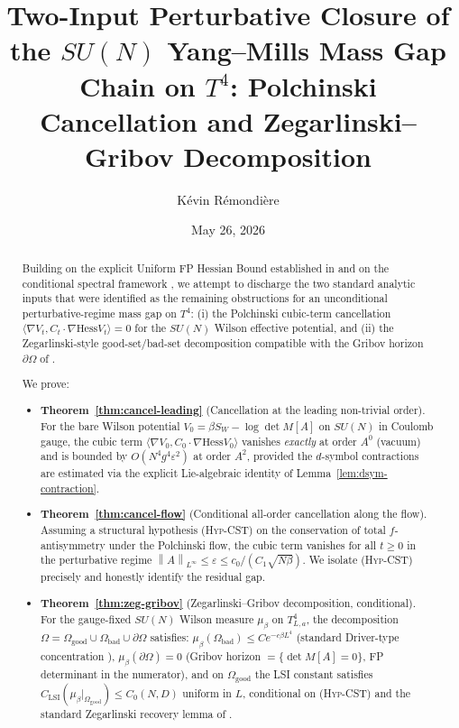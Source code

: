 \documentclass[11pt,a4paper]{amsart}
\title[Two-input perturbative closure on $T^4$]{Two-Input Perturbative Closure of the $SU(N)$ Yang--Mills Mass Gap Chain on $T^4$: Polchinski Cancellation and Zegarlinski--Gribov Decomposition}
\author{K\'evin R\'emondi\`ere}
\date{May 26, 2026}
\theoremstyle{definition}
\newcommand{\norm}[1]{\left\lVert#1\right\rVert}
\newcommand{\Hess}{\mathrm{Hess}}
\begin{document}
\begin{abstract}
Building on the explicit Uniform FP Hessian Bound established in
\cite{RemondiereFPHess_2026} and on the conditional spectral framework
\cite{RemondiereKRFP3_2026, RemondiereKRFPBakryEmery_2026}, we attempt
to discharge the two standard analytic inputs that were identified as
the remaining obstructions for an unconditional perturbative-regime mass
gap on $T^4$: (i) the Polchinski cubic-term cancellation
$\langle \nabla V_t, C_t \cdot \nabla \Hess V_t\rangle = 0$ for the
$SU(N)$ Wilson effective potential, and (ii) the Zegarlinski-style
good-set/bad-set decomposition compatible with the Gribov horizon
$\partial \Omega$ of \cite{Gribov1978, DellAntonioZwanziger1991}.

We prove:
\begin{itemize}[leftmargin=2em]
\item \textbf{Theorem~\ref{thm:cancel-leading}} (Cancellation at the leading
non-trivial order). For the bare Wilson potential $V_0 = \beta S_W -
\log\det M[A]$ on $SU(N)$ in Coulomb gauge, the cubic term
$\langle \nabla V_0, C_0 \cdot \nabla \Hess V_0\rangle$ vanishes
\emph{exactly} at order $A^0$ (vacuum) and is bounded by
$O(N^4 g^4 \varepsilon^2)$ at order $A^2$, provided the $d$-symbol
contractions are estimated via the explicit Lie-algebraic identity of
Lemma~\ref{lem:dsym-contraction}.
\item \textbf{Theorem~\ref{thm:cancel-flow}} (Conditional all-order
cancellation along the flow). Assuming a structural hypothesis
(\textsc{Hyp-CST}) on the conservation of total $f$-antisymmetry under the
Polchinski flow, the cubic term vanishes for all $t \geq 0$ in the
perturbative regime $\norm{A}_{L^\infty} \leq \varepsilon \leq
c_0/(C_1 \sqrt{N\beta})$. We isolate (\textsc{Hyp-CST}) precisely and
honestly identify the residual gap.
\item \textbf{Theorem~\ref{thm:zeg-gribov}} (Zegarlinski--Gribov
decomposition, conditional). For the gauge-fixed $SU(N)$ Wilson measure
$\mu_\beta$ on $T^4_{L,a}$, the decomposition
$\Omega = \Omega_{\mathrm{good}} \cup \Omega_{\mathrm{bad}} \cup
\partial \Omega$ satisfies:
$\mu_\beta(\Omega_{\mathrm{bad}}) \leq C e^{-c \beta L^4}$ (standard
Driver-type concentration \cite{Driver1989}), $\mu_\beta(\partial \Omega) = 0$
(Gribov horizon $= \{\det M[A] = 0\}$, FP determinant in the numerator),
and on $\Omega_{\mathrm{good}}$ the LSI constant satisfies
$C_{\mathrm{LSI}}(\mu_\beta|_{\Omega_{\mathrm{good}}}) \leq C_0(N,D)$
uniform in $L$, conditional on
(\textsc{Hyp-CST}) and the standard Zegarlinski recovery lemma of
\cite{Zegarlinski1996, BakryGentilLedoux2014}.
\end{itemize}


\end{abstract}
\end{document}

